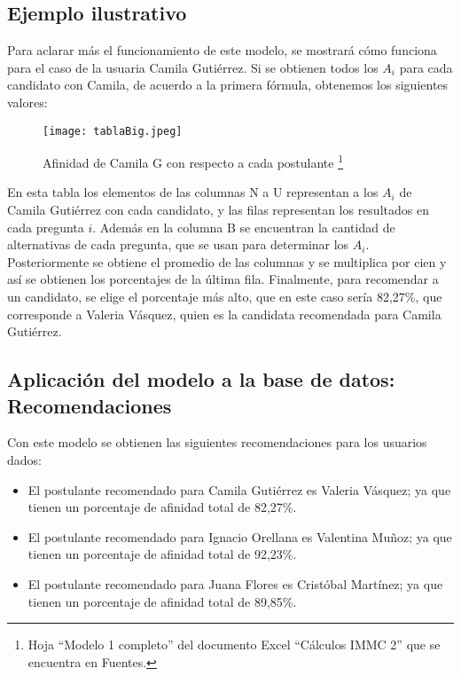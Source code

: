 \documentclass[a4paper]{article}
\begin{document}
\subsection{Ejemplo ilustrativo}
Para aclarar más el funcionamiento de este modelo, se mostrará cómo funciona para el caso de la usuaria Camila Gutiérrez. Si se obtienen todos los $A_{i}$ para cada candidato con Camila, de acuerdo a la primera fórmula, obtenemos los siguientes valores: 
 \newline 
\begin{figure}[H]
    \begin{center}
\texttt{[image: tablaBig.jpeg]}    
\end{center}   
    \caption{Afinidad de Camila G con respecto a cada postulante \footnote{Hoja “Modelo 1 completo” del documento Excel “Cálculos IMMC 2” que se encuentra en Fuentes.}}
\end{figure} 
\newline
En esta tabla los elementos de las columnas N a U representan a los $A_{i}$ de Camila Gutiérrez con cada candidato, y las filas representan los resultados en cada pregunta $i$. Además en la columna B se encuentran la cantidad de alternativas de cada pregunta, que se usan para determinar los $A_{i}$. Posteriormente se obtiene el promedio de las columnas y se multiplica por cien y así se obtienen los porcentajes de la última fila. Finalmente, para recomendar a un candidato, se elige el porcentaje más alto, que en este caso sería 82,27\%, que corresponde a Valeria Vásquez, quien es la candidata recomendada para Camila Gutiérrez.
\subsection{Aplicación del modelo a la base de datos: Recomendaciones}
Con este modelo se obtienen las siguientes recomendaciones para los usuarios dados: 
\begin{itemize}
\item El postulante recomendado para Camila Gutiérrez es Valeria Vásquez; ya que tienen un porcentaje de afinidad total de 82,27\%.
\item El postulante recomendado para Ignacio Orellana es Valentina Muñoz; ya que tienen un porcentaje de afinidad total de 92,23\%.
\item El postulante recomendado para Juana Flores es Cristóbal Martínez; ya que tienen un porcentaje de afinidad total de 89,85\%.
\end{itemize} 
\end{document}
